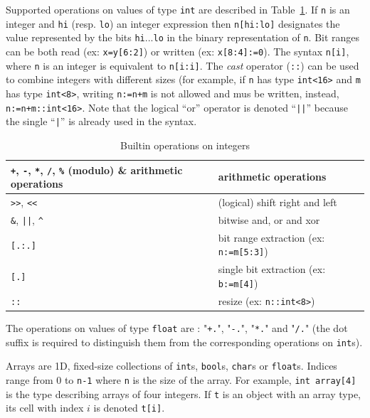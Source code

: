\medskip
\step Supported operations on values of type \texttt{int} are described in Table~\ref{tab:int-ops}.
If \verb|n| is an integer and \verb|hi| (resp. \verb|lo|) an integer expression then \verb|n[hi:lo]|
designates the value represented by the bits \verb|hi|...\verb|lo| in the binary representation of
\verb|n|. Bit ranges can be both read (ex: \verb|x=y[6:2]|) or written (ex: \verb|x[8:4]:=0|). The
syntax \verb|n[i]|, where \verb|n| is an integer is equivalent to \verb|n[i:i]|. The \emph{cast}
operator (\verb|::|) can be used to combine integers with different sizes (for example, if \verb|n|
has type \verb|int<16>| and \verb|m| has type \verb|int<8>|, writing \verb|n:=n+m| is not allowed
and mus be written, instead, \verb|n:=n+m::int<16>|. Note that the
logical ``or'' operator is denoted ``\verb+||+'' because the single ``\verb+|+'' is already used in
the syntax.

\begin{table}[h]
\begin{center}
\begin{tabular}{|l|l|} \hline
\verb|+|, \verb|-|, \verb|*|, \verb|/|, \verb|%| (modulo) & arithmetic operations \\ \hline 
\verb|>>|, \verb|<<| & (logical) shift right and left \\ \hline 
\verb|&|, \verb+||+, \verb|^| & bitwise and, or and xor \\ \hline 
\verb|[.:.]| & bit range extraction (ex: \verb|n:=m[5:3]|) \\ \hline 
\verb|[.]| & single bit extraction (ex: \verb|b:=m[4]|) \\ \hline 
\verb|::| & resize (ex: \verb|n::int<8>|) \\ \hline 
\end{tabular}
\caption{\label{tab:int-ops}Builtin operations on integers}
\end{center}
\end{table}

\medskip
\step The operations on values of type \texttt{float} are : "\verb|+.|", "\verb|-.|", "\verb|*.|" and
"\verb|/.|" (the dot suffix is required to distinguish them from the corresponding operations on
\texttt{int}s).

\medskip
\step Arrays are 1D, fixed-size collections of \verb|int|s, \verb|bool|s, \verb|char|s or \verb|float|s. Indices
range from 0 to \verb|n-1| where \verb|n| is the size of the array. For example,
 \verb|int array[4]| is the type describing arrays of four integers. If \verb|t| is an object
  with an array type, its cell with index $i$ is denoted \verb|t[i]|.

